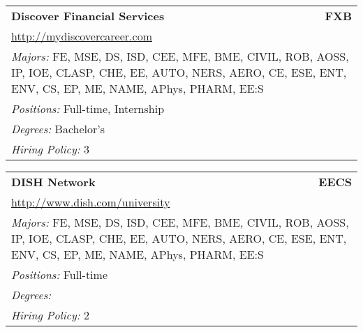 \documentclass[twoside]{article}
\begin{document}
\begin{center}
\begin{multicols}{3}
\begin{FlushLeft}
\begin{minipage}{.9\columnwidth}
\end{minipage}
 
\begin{minipage}{.9\columnwidth}\begin{tabularx}{.95\columnwidth}{Xr}
                 {\Large\bf Discover Financial Services} & {\Large\bf FXB}\\
    \multicolumn{2}{p{.95\columnwidth}}{\url{http://mydiscovercareer.com}}\\
    \multicolumn{2}{p{.95\columnwidth}}{\emph{Majors:} FE, MSE, DS, ISD, CEE, MFE, BME, CIVIL, ROB, AOSS, IP, IOE, CLASP, CHE, EE, AUTO, NERS, AERO, CE, ESE, ENT, ENV, CS, EP, ME, NAME, APhys, PHARM, EE:S}\\
    \multicolumn{2}{p{.95\columnwidth}}{\emph{Positions:} Full-time, Internship}\\
    \multicolumn{2}{p{.95\columnwidth}}{\emph{Degrees:} Bachelor's}\\
    \multicolumn{2}{p{.95\columnwidth}}{\emph{Hiring Policy:} 3}\\
    \end{tabularx}
    
\end{minipage}
 
\begin{minipage}{.9\columnwidth}\begin{tabularx}{.95\columnwidth}{Xr}
                 {\Large\bf DISH Network} & {\Large\bf EECS}\\
    \multicolumn{2}{p{.95\columnwidth}}{\url{http://www.dish.com/university}}\\
    \multicolumn{2}{p{.95\columnwidth}}{\emph{Majors:} FE, MSE, DS, ISD, CEE, MFE, BME, CIVIL, ROB, AOSS, IP, IOE, CLASP, CHE, EE, AUTO, NERS, AERO, CE, ESE, ENT, ENV, CS, EP, ME, NAME, APhys, PHARM, EE:S}\\
    \multicolumn{2}{p{.95\columnwidth}}{\emph{Positions:} Full-time}\\
    \multicolumn{2}{p{.95\columnwidth}}{\emph{Degrees:} }\\
    \multicolumn{2}{p{.95\columnwidth}}{\emph{Hiring Policy:} 2}\\
    \end{tabularx}
    
\end{minipage}
 

\end{FlushLeft}
\end{multicols}
\end{center}
\end{document}

